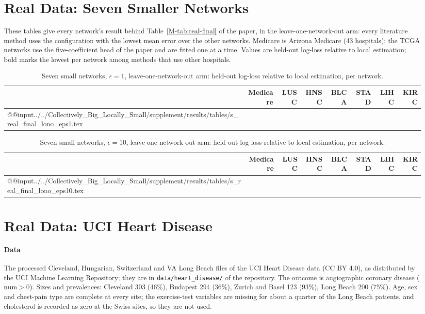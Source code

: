 \documentclass[acmsmall,screen,nonacm]{acmart}
\theoremstyle{acmdefinition}
\begin{document}
\section{Real Data: Seven Smaller Networks}\label{sec:eight}

These tables give every network's result behind Table~\ref{M-tab:real-final} of the paper, in the leave-one-network-out arm: every literature method uses the configuration with the lowest mean error over the other networks. Medicare is Arizona Medicare (43 hospitals); the TCGA networks use the five-coefficient head of the paper and are fitted one at a time. Values are held-out log-loss relative to local estimation; bold marks the lowest per network among methods that use other hospitals.

\begin{table}[t]
\caption{Seven small networks, $\epsilon=1$, leave-one-network-out arm: held-out log-loss relative to local estimation, per network.}
\label{tab:eight-eps1}
\scriptsize
\setlength{\tabcolsep}{2.4pt}
\begin{tabular}{@{}lrrrrrrr@{}}
\toprule
 & Medicare & LUSC & HNSC & BLCA & STAD & LIHC & KIRC\\
\midrule
\csname @@input\endcsname ../../Collectively_Big_Locally_Small/supplement/results/tables/s_real_final_lono_eps1.tex 
\bottomrule
\end{tabular}
\end{table}

\begin{table}[t]
\caption{Seven small networks, $\epsilon=10$, leave-one-network-out arm: held-out log-loss relative to local estimation, per network.}
\label{tab:eight-eps10}
\scriptsize
\setlength{\tabcolsep}{2.4pt}
\begin{tabular}{@{}lrrrrrrr@{}}
\toprule
 & Medicare & LUSC & HNSC & BLCA & STAD & LIHC & KIRC\\
\midrule
\csname @@input\endcsname ../../Collectively_Big_Locally_Small/supplement/results/tables/s_real_final_lono_eps10.tex 
\bottomrule
\end{tabular}
\end{table}

\section{Real Data: UCI Heart Disease}\label{sec:real}

\paragraph{Data} The processed Cleveland, Hungarian, Switzerland and VA Long Beach files of the UCI Heart Disease data \cite{detrano1989international} (CC BY 4.0), as distributed by the UCI Machine Learning Repository; they are in \texttt{data/heart\_disease/} of the repository. The outcome is angiographic coronary disease ($\text{num}>0$). Sizes and prevalences: Cleveland 303 (46\%), Budapest 294 (36\%), Zurich and Basel 123 (93\%), Long Beach 200 (75\%). Age, sex and chest-pain type are complete at every site; the exercise-test variables are missing for about a quarter of the Long Beach patients, and cholesterol is recorded as zero at the Swiss sites, so they are not used.
\end{document}
